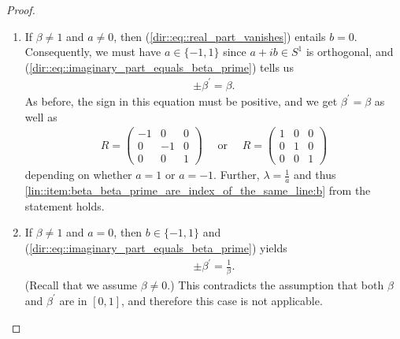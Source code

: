\documentclass{amsart}
\begin{document}
\begin{proof}
\begin{enumerate}
        \begin{align*}
            \pm \beta^\prime = \beta = 1.
        \end{align*}
        Since $\beta, \beta^\prime \in [0,1]$ the sign in the above equation must be positive, and we obtain $\beta^\prime = \beta$ as well as
        \begin{align*}
            R = \begin{pmatrix}
                a & b & 0 \\
                -b & a & 0 \\
                0 & 0 & 1
            \end{pmatrix}.
        \end{align*}
        Further, we have
        $
            \lambda = \frac{1}{a+ib} = a-ib,
        $
        and this proves \ref{lin::item:beta_beta_prime_are_index_of_the_same_line:a}.
        \item If $\beta \neq 1$ and $a \neq 0$, then (\ref{dir::eq::real_part_vanishes}) entails $b = 0$. Consequently, we must have $a \in \{-1,1\}$ since $a+ib \in S^1$ is orthogonal, and (\ref{dir::eq::imaginary_part_equals_beta_prime}) tells us
        \begin{align*}
            \pm \beta^\prime = \beta.
        \end{align*}
        As before, the sign in this equation must be positive, and we get $\beta^\prime = \beta$ as well as
        \begin{align*}
            R = \begin{pmatrix}
                -1 & 0 & 0 \\
                0 & -1 & 0 \\
                0 & 0 & 1
            \end{pmatrix}
            \quad \text{ or } \quad 
            R = \begin{pmatrix}
                1 & 0 & 0 \\
                0 & 1 & 0 \\
                0 & 0 & 1
            \end{pmatrix}
        \end{align*}
        depending on whether $a = 1$ or $a = -1$.
        Further, $\lambda = \frac{1}{a}$ and thus \ref{lin::item:beta_beta_prime_are_index_of_the_same_line:b} from the statement holds.
        \item If $\beta \neq 1$ and $a =0$, then $b \in \{-1, 1\}$ and (\ref{dir::eq::imaginary_part_equals_beta_prime}) yields
        \begin{align*}
            \pm \beta^\prime = \frac{1}{\beta}.
        \end{align*}
        (Recall that we assume $\beta \neq 0$.) This contradicts the assumption that both $\beta$ and $\beta^\prime$ are in $[0,1]$, and therefore this case is not applicable.
    \end{enumerate}
\end{proof}
\end{document}
